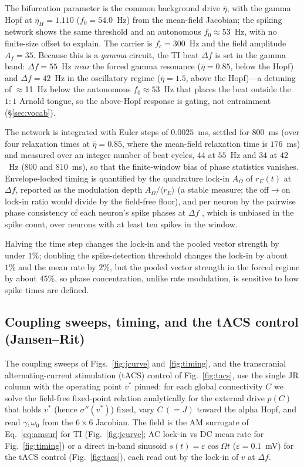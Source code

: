 \documentclass[11pt,a4paper]{article}
\newcommand{\Sig}{\sigma}
\begin{document}
The bifurcation parameter is the common
background drive $\bar\eta$, with the gamma Hopf at $\bar\eta_H=1.110$ ($f_0=54.0$~Hz)
from the mean-field Jacobian; the spiking network shows the same threshold and an
autonomous $f_0\!\approx\!53$~Hz, with no finite-size offset to explain. The carrier is
$f_c=300$~Hz and the field amplitude $A_f=35$. Because
this is a \emph{gamma} circuit, the TI beat $\Delta f$ is set in the gamma band:
$\Delta f=55$~Hz \emph{near} the forced gamma resonance ($\bar\eta=0.85$, below the Hopf) and
$\Delta f=42$~Hz in the oscillatory regime ($\bar\eta=1.5$, above the Hopf)---a detuning of
$\approx$11~Hz below the autonomous $f_0\!\approx\!53$~Hz that places the beat outside the
$1{:}1$ Arnold tongue, so the above-Hopf response is gating, not entrainment
(\S\ref{sec:vocab}).

The network is integrated with Euler steps of $0.0025$~ms, settled for $800$~ms (over
four relaxation times at $\bar\eta=0.85$, where the mean-field relaxation time is
$176$~ms) and measured over an integer number of beat cycles, $44$ at $55$~Hz and $34$ at
$42$~Hz ($800$ and $810$~ms), so that the finite-window bias of phase statistics
vanishes. Envelope-locked timing is quantified by the quadrature lock-in $A_\Omega$ of
$r_E(t)$ at $\Delta f$, reported as the modulation depth $A_\Omega/\langle r_E\rangle$ (a
stable measure; the off$\to$on lock-in ratio would divide by the field-free floor), and
per neuron by the pairwise phase consistency of each neuron's spike phases at $\Delta f$
\cite{vinck2010}, which is unbiased in the spike count, over neurons with at least ten
spikes in the window.

Halving the time step changes the lock-in and the pooled vector
strength by under $1\%$; doubling the spike-detection threshold changes the lock-in by
about $1\%$ and the mean rate by $2\%$, but the pooled vector strength in the forced
regime by about $45\%$, so phase concentration, unlike rate modulation, is sensitive to
how spike times are defined.

\subsection{Coupling sweeps, timing, and the tACS control (Jansen--Rit)}
The coupling sweeps of Figs.~\ref{fig:jcurve} and~\ref{fig:timing}, and the transcranial
alternating-current stimulation (tACS) control of Fig.~\ref{fig:tacs}, use the single JR
column with the operating point $v^*$ pinned: for
each global connectivity $C$ we solve the field-free fixed-point relation analytically
for the external drive $p(C)$ that holds $v^*$ (hence $\Sig''(v^*)$) fixed, vary $C\,(=J)$
toward the alpha Hopf, and read $\gamma,\omega_0$ from the $6\times6$ Jacobian. The field
is the AM surrogate of Eq.~\eqref{eq:amsur} for TI (Fig.~\ref{fig:jcurve}; AC lock-in vs DC mean
rate for Fig.~\ref{fig:timing}) or a direct in-band sinusoid $s(t)=\varepsilon\cos\Omega t$
($\varepsilon=0.1$~mV) for the tACS control (Fig.~\ref{fig:tacs}), each read out by the
lock-in of $v$ at $\Delta f$.
\end{document}
